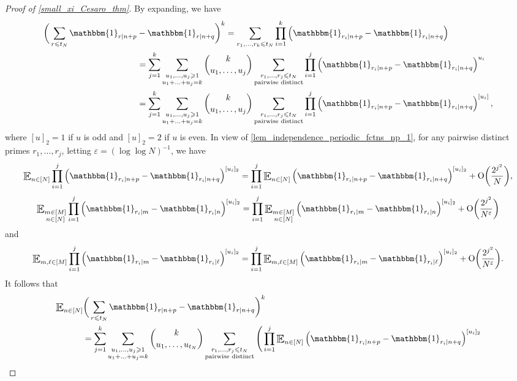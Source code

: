 \documentclass[letter,11pt]{article}
\theoremstyle{plain} %
\theoremstyle{definition} %
\theoremstyle{plain}
\theoremstyle{plain}
\theoremstyle{plain}
\numberwithin{equation}{section}
\newcommand{\Oh}{{\mathrm O}}
\renewcommand{\epsilon}{\varepsilon}
\renewcommand{\leq}{\leqslant}
\renewcommand{\geq}{\geqslant}
\newcommand{\Esub}[1]{\raisebox{-0.4ex}{\scalebox{1.4}[1.3]{$\mathbb{E}$}}\raisebox{-0.35ex}{\ensuremath{_{\scriptstyle #1}}}}
\newcommand{\1}{\mathbbm{1}}
\begin{document}
\begin{proof}[Proof of \cref{small_xi_Cesaro_thm}]
By expanding, we have
\begin{align*}
\bigg(\sum_{r\leq t_N}\1_{r\mid n+p} & - \1_{r\mid n+q}\bigg)^k
= \sum_{r_1,\ldots,r_k\leq t_N} \prod_{i=1}^k \left(\1_{r_i\mid n+p} - \1_{r_i\mid n+q}\right) \\
& = \sum_{j=1}^k \sum_{\substack{u_1,\ldots,u_j\geq 1 \\ u_1+\ldots+u_j=k}}\binom{k}{u_1,\ldots,u_j}\sum_{\substack{r_1,\ldots,r_j\leq t_N \\ \text{pairwise distinct}}}\prod_{i=1}^j \left(\1_{r_i\mid n+p} - \1_{r_i\mid n+q}\right)^{u_i} \\
& = 
\sum_{j=1}^k \sum_{\substack{u_1,\ldots,u_j\geq 1 \\ u_1+\ldots+u_j=k}}\binom{k}{u_1,\ldots,u_j}\sum_{\substack{r_1,\ldots,r_j\leq t_N \\ \text{pairwise distinct}}}\prod_{i=1}^j \left(\1_{r_i\mid n+p} - \1_{r_i\mid n+q}\right)^{[u_i]},
\end{align*}
where $[u]_2=1$ if $u$ is odd and $[u]_2=2$ if $u$ is even.
In view of \cref{lem_independence_periodic_fctns_np_1}, for any pairwise distinct primes $r_1,\ldots,r_j$, letting $\epsilon = (\log\log{N})^{-1}$, we have
$$\Esub{n\in[N]}\prod_{i=1}^{j}\left(\1_{r_i\mid n+p}-\1_{r_i\mid n+q}\right)^{[u_i]_2} 
= \prod_{i=1}^{j}\Esub{n\in[N]}\left(\1_{r_i\mid n+p}-\1_{r_i\mid n+q}\right)^{[u_i]_2}
+ \Oh\bigg(\frac{2^{j^2}}{N}\bigg),$$
$$\Esub{\substack{m\in[M] \\ n\in[N]}} \prod_{i=1}^{j} \left(\1_{r_i\mid m}-\1_{r_i\mid n}\right)^{[u_i]_2}
= \prod_{i=1}^{j}\Esub{\substack{m\in[M] \\ n\in[N]}} \left(\1_{r_i\mid m}-\1_{r_i\mid n}\right)^{[u_i]_2}
+ \Oh\bigg(\frac{2^{j^2}}{N^\epsilon}\bigg)$$
and 
$$\Esub{m,\ell\in[M]} \prod_{i=1}^{j} \left(\1_{r_i\mid m}-\1_{r_i\mid \ell}\right)^{[u_i]_2}
= \prod_{i=1}^{j}\Esub{m,\ell\in[M]}\left(\1_{r_i\mid m}-\1_{r_i\mid \ell}\right)^{[u_i]_2}
+ \Oh\bigg(\frac{2^{j^2}}{N^\epsilon}\bigg).$$
It follows that
\begin{align*}
&\Esub{n\in[N]}\bigg(\sum_{r\leq t_N}\1_{r\mid n+p}-\1_{r\mid n+q}\bigg)^k
\\
& \hspace*{1.1cm} = \sum_{j=1}^k \sum_{\substack{u_1,\ldots,u_j\geq 1 \\ u_1+\ldots+u_j=k}} \binom{k}{u_1,\ldots,u_{t_N}} \sum_{\substack{r_1,\ldots,r_j\leq t_N \\ \text{pairwise distinct}}}\Bigg(\prod_{i=1}^j \Esub{n\in[N]}  
\left(\1_{r_i\mid n+p}-\1_{r_i\mid n+q}\right)^{[u_i]_2} \\

\end{align*}
\end{proof}
\end{document}
